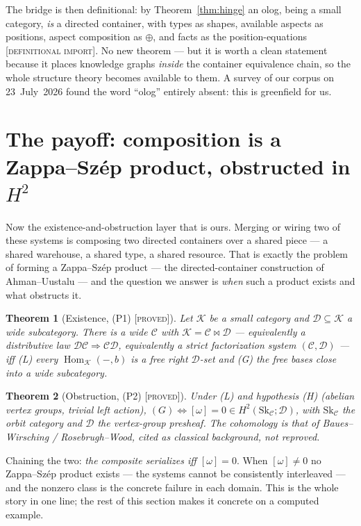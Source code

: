 \documentclass[11pt]{article}
\newtheorem{theorem}{Theorem}
\theoremstyle{definition}
\newcommand{\Hom}{\operatorname{Hom}}
\newcommand{\C}{\mathcal{C}}
\newcommand{\D}{\mathcal{D}}
\newcommand{\Sk}{\mathrm{Sk}}
\newcommand{\gProved}{\textsc{[proved]}}
\newcommand{\gImport}{\textsc{[definitional import]}}
\begin{document}
The bridge is then definitional: by Theorem~\ref{thm:hinge} an olog, being a small category,
\emph{is} a directed container, with types as shapes, available aspects as positions, aspect
composition as $\oplus$, and facts as the position-equations \gImport. No new theorem --- but
it is worth a clean statement because it places knowledge graphs \emph{inside} the container
equivalence chain, so the whole structure theory becomes available to them. A survey of our
corpus on 23~July~2026 found the word ``olog'' entirely absent: this is greenfield for us.

\section{The payoff: composition is a Zappa--Sz\'ep product, obstructed in $H^2$}
\label{sec:payoff}

Now the existence-and-obstruction layer that is ours. Merging or wiring two of these systems is
composing two directed containers over a shared piece --- a shared warehouse, a shared type,
a shared resource. That is exactly the problem of forming a Zappa--Sz\'ep product --- the
directed-container construction of Ahman--Uustalu \cite{au-distlaw} --- and the question we
answer is \emph{when} such a product exists and what obstructs it.

\begin{theorem}[Existence, (P1) \cite{pairwise} \gProved]\label{thm:exist}
Let $\mathcal{K}$ be a small category and $\D\subseteq\mathcal{K}$ a wide subcategory.
There is a wide $\C$ with $\mathcal{K}=\C\bowtie\D$ --- equivalently a distributive law
$\D\C\Rightarrow\C\D$, equivalently a strict factorization system $(\C,\D)$ --- iff
\textnormal{(L)} every $\Hom_{\mathcal{K}}(-,b)$ is a free right $\D$-set and
\textnormal{(G)} the free bases close into a wide subcategory.
\end{theorem}

\begin{theorem}[Obstruction, (P2) \cite{gobstr} \gProved]\label{thm:obstr}
Under \textnormal{(L)} and hypothesis \textnormal{(H)} (abelian vertex groups, trivial left
action), $(G)\Leftrightarrow[\omega]=0\in H^2(\Sk_\C;\D)$, with $\Sk_\C$ the orbit category
and $\D$ the vertex-group presheaf. The cohomology is that of Baues--Wirsching /
Rosebrugh--Wood, cited as classical background, not reproved.
\end{theorem}

Chaining the two: \emph{the composite serializes iff $[\omega]=0$}. When $[\omega]\neq0$ no
Zappa--Sz\'ep product exists --- the systems cannot be consistently interleaved --- and the
nonzero class is the concrete failure in each domain. This is the whole story in one line;
the rest of this section makes it concrete on a computed example.
\end{document}
